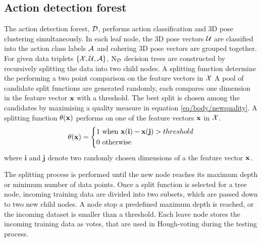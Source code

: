 \subsection{Action detection forest}
\label{sec/body/adflearn}
The action detection forest, $\mathcal{D}$, performs action classification and 3D pose clustering simultaneously.  
In each leaf node, the 3D pose vectors $\mathcal{U}$ are classified into the action class labels $\mathcal{A}$ and cohering 3D pose vectors are grouped together.
For given data triplets $\{\mathcal{X},\mathcal{U}, \mathcal{A}\}$, $\mathrm{N_{\mathcal{D}}}$ decision trees are constructed by recursively splitting the data into two child nodes. A splitting function determine the    
performing a two point comparison on the feature vectors in $\mathcal{X}$   
A pool of candidate split functions are generated randomly, each compares one dimension in the feature vector $\mathbf{x}$ with a threshold. 
The best split is chosen among the candidates by maximising a quality measure in equation \ref{eq/body/newquality}. A splitting function $\theta(\mathbf{x})$ performs on one of the feature vectors $\mathbf{x}$ in $\mathcal{X}$.   
\begin{equation}
	\theta(\mathbf{x}) = 
	\left\{
		\begin{aligned}
			1 & \mbox{ when } \mathbf{x}(\mathbf{i}) - \mathbf{x}(\mathbf{j}) > threshold \\  
			0 & \mbox{ otherwise } 
		\end{aligned}
	\right.
	\label{eqn/body/split}
\end{equation}
where $\mathbf{i}$ and $\mathbf{j}$ denote two randomly chosen dimensions of a the feature vector $\mathbf{x}$. 

The splitting process is performed until the new node reaches its maximum depth or minimum number of data points. 
Once a split function is selected for a tree node, incoming training data are divided into two subsets, which are passed down to two new child nodes.  
A node stop a predefined maximum depth is reached, or the incoming dataset is smaller than a threshold. Each leave node stores the incoming training data as votes, that are used in Hough-voting during the testing process. 

